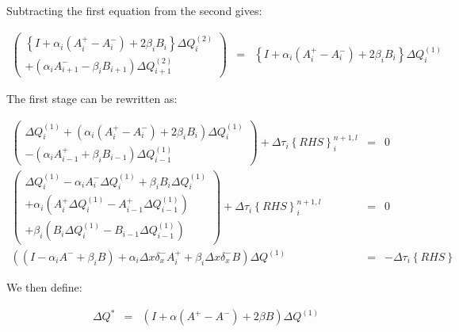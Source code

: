 Subtracting the first equation from the second gives:

\begin{eqnarray}
\left(
\begin{array}{c}
\left\{
I + \alpha_i \left(
A_i^+ 
-A_i^- 
\right)
+ 2 \beta_i B_i
\right\}
\Delta Q^{\left(2 \right)}_i
\\
+ \left( 
\alpha_i A^-_{i+1}  
-
\beta_i B_{i+1} 
\right)
\Delta Q^{\left(2 \right)}_{i+1}
\end{array}
\right)
&=&
\left\{
I + \alpha_i \left(
A_i^+ 
- A_i^- 
\right)
+ 2 \beta_i B_i
\right\}
\Delta Q^{\left(1 \right)}_i
\nonumber
\end{eqnarray}

The first stage can be rewritten as:

\begin{eqnarray}
\left(
\begin{array}{c}
\Delta Q^{\left(1 \right)}_i
+ \left(
\alpha_i \left(A^+_i - A^-_i \right)
+ 2 \beta_i B_i \right)
\Delta Q^{\left(1 \right)}_i
\\
-
\left( 
\alpha_i A^+_{i-1} 
+
\beta_i B_{i-1} 
\right)
\Delta Q^{\left(1 \right)}_{i-1}
\end{array}
\right)
+ \Delta \tau_i \left\{RHS \right\}^{n+1,l}_i &=& 0
\nonumber
\\
\left(
\begin{array}{c}
\Delta Q^{\left(1 \right)}_i
- \alpha_i A^-_i 
\Delta Q^{\left(1 \right)}_i
+ \beta_i B_i 
\Delta Q^{\left(1 \right)}_i
\\
+ \alpha_i
\left(
A^+_i 
\Delta Q^{\left(1 \right)}_{i}
- 
A^+_{i-1} 
\Delta Q^{\left(1 \right)}_{i-1}
\right)
\\
+ \beta_i 
\left(
B_i 
\Delta Q^{\left(1 \right)}_i
-
B_{i-1} 
\Delta Q^{\left(1 \right)}_{i-1}
\right)
\end{array}
\right)
+ \Delta \tau_i \left\{RHS \right\}^{n+1,l}_i &=& 0
\nonumber
\\
\left(
\left(
I
- \alpha_i A^-
+ \beta_i B
\right)
+ \alpha_i
\Delta x
\delta_x^-
A^+_i 
+ \beta_i 
\Delta x
\delta_x^-
B
\right)
\Delta Q^{\left(1 \right)}
&=&
- \Delta \tau_i \left\{RHS \right\} 
\nonumber
\end{eqnarray}

We then define:

\begin{eqnarray}
\Delta Q^{*}
&=&
\left(I + \alpha
\left(A^+ - A^- \right)
+ 2 \beta B
\right) 
\Delta Q^{\left(1 \right)}
\nonumber
\end{eqnarray}


